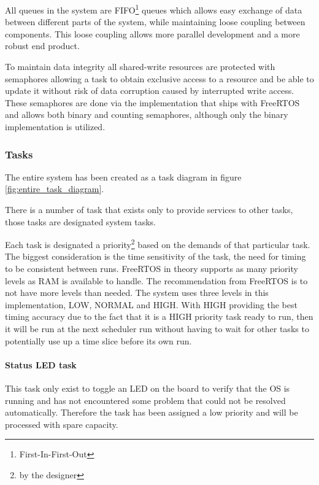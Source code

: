 \documentclass[../../../main]{subfiles}
\begin{document}
All queues in the system are FIFO\footnote{First-In-First-Out} queues which allows easy exchange of data between different parts of the system, while maintaining loose coupling between components. This loose coupling allows more parallel development and a more robust end product.

To maintain data integrity all shared-write resources are protected with semaphores allowing a task to obtain exclusive access to a resource and be able to update it without risk of data corruption caused by interrupted write access.
These semaphores are done via the implementation that ships with FreeRTOS and allows both binary and counting semaphores, although only the binary implementation is utilized.



\subsubsection{Tasks}

The entire system has been created as a task diagram in figure \ref{fig:entire_task_diagram}.

There is a number of task that exists only to provide services to other tasks, those tasks are designated system tasks.

Each task is designated a priority\footnote{by the designer} based on the demands of that particular task. The biggest consideration is the time sensitivity of the task, the need for timing to be consistent between runs. FreeRTOS in theory supports as many priority levels as RAM is available to handle. The recommendation from FreeRTOS is to not have more levels than needed. The system uses three levels in this implementation, LOW, NORMAL and HIGH. With HIGH providing the best timing accuracy due to the fact that it is a HIGH priority task  ready to run, then it will be run at the next scheduler run without having to wait for other tasks to potentially use up a time slice before its own run.


\paragraph{Status LED task}

This task only exist to toggle an LED on the board to verify that the OS is running and has not encountered some problem that could not be resolved automatically. Therefore the task has been assigned a low priority and will be processed with spare capacity.
\end{document}
